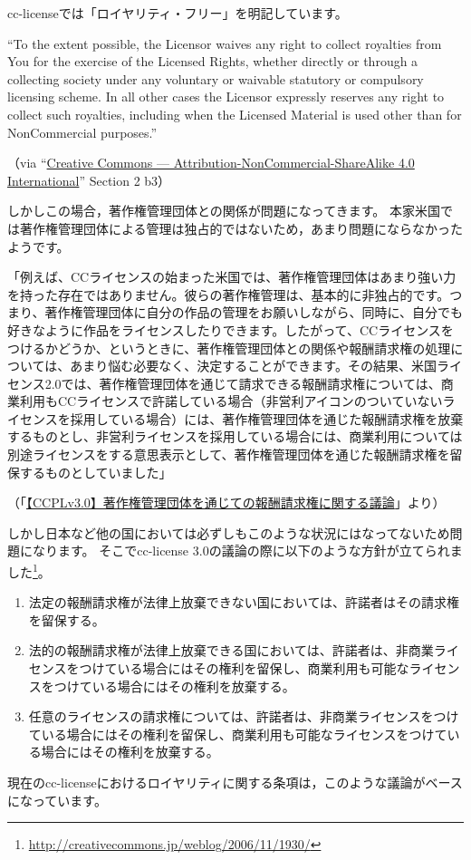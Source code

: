 \documentclass{ltjsarticle}
\begin{document}
cc-licenseでは「ロイヤリティ・フリー」を明記しています。
\begin{mdframed}
``To the extent possible, the Licensor waives any right to collect royalties from You for the exercise of the Licensed Rights, whether directly or through a collecting society under any voluntary or waivable statutory or compulsory licensing scheme. In all other cases the Licensor expressly reserves any right to collect such royalties, including when the Licensed Material is used other than for NonCommercial purposes.'' \par
（via ``\href{http://creativecommons.org/licenses/by-nc-sa/4.0/legalcode}{Creative Commons — Attribution-NonCommercial-ShareAlike 4.0 International}'' Section 2 b3）
\end{mdframed}
しかしこの場合，著作権管理団体との関係が問題になってきます。
本家米国では著作権管理団体による管理は独占的ではないため，あまり問題にならなかったようです。
\begin{mdframed}
「例えば、CCライセンスの始まった米国では、著作権管理団体はあまり強い力を持った存在ではありません。彼らの著作権管理は、基本的に非独占的です。つまり、著作権管理団体に自分の作品の管理をお願いしながら、同時に、自分でも好きなように作品をライセンスしたりできます。したがって、CCライセンスをつけるかどうか、というときに、著作権管理団体との関係や報酬請求権の処理については、あまり悩む必要なく、決定することができます。その結果、米国ライセンス2.0では、著作権管理団体を通じて請求できる報酬請求権については、商業利用もCCライセンスで許諾している場合（非営利アイコンのついていないライセンスを採用している場合）には、著作権管理団体を通じた報酬請求権を放棄するものとし、非営利ライセンスを採用している場合には、商業利用については別途ライセンスをする意思表示として、著作権管理団体を通じた報酬請求権を留保するものとしていました」\par
（「\href{http://creativecommons.jp/weblog/2006/11/1930/}{【CCPLv3.0】著作権管理団体を通じての報酬請求権に関する議論}」より）
\end{mdframed}
しかし日本など他の国においては必ずしもこのような状況にはなってないため問題になります。
そこでcc-license 3.0の議論の際に以下のような方針が立てられました\footnote{\url{http://creativecommons.jp/weblog/2006/11/1930/}}。
\begin{enumerate}
\item 法定の報酬請求権が法律上放棄できない国においては、許諾者はその請求権を留保する。
\item 法的の報酬請求権が法律上放棄できる国においては、許諾者は、非商業ライセンスをつけている場合にはその権利を留保し、商業利用も可能なライセンスをつけている場合にはその権利を放棄する。
\item 任意のライセンスの請求権については、許諾者は、非商業ライセンスをつけている場合にはその権利を留保し、商業利用も可能なライセンスをつけている場合にはその権利を放棄する。
\end{enumerate}
現在のcc-licenseにおけるロイヤリティに関する条項は，このような議論がベースになっています。
\end{document}

